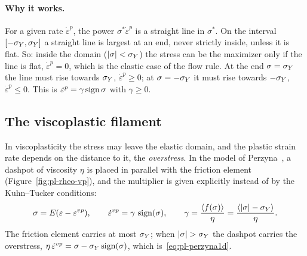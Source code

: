 \paragraph{Why it works.} For a given rate $\dot\varepsilon^p$, the power
$\sigma^\ast\dot\varepsilon^p$ is a straight line in $\sigma^\ast$. On the
interval $[-\sigma_{Y},\sigma_{Y}]$ a straight line is largest at an end, never strictly
inside, unless it is flat. So: inside the domain ($|\sigma|<\sigma_{Y}$) the stress
can be the maximizer only if the line is flat, $\dot\varepsilon^p=0$, which is
the elastic case of the flow rule. At the end $\sigma=\sigma_{Y}$ the line must rise
towards $\sigma_{Y}$, $\dot\varepsilon^p\ge0$; at $\sigma=-\sigma_{Y}$ it must rise towards
$-\sigma_{Y}$, $\dot\varepsilon^p\le0$. This is
$\dot\varepsilon^p=\gamma\operatorname{sign}\sigma$ with $\gamma\ge0$.

\subsection{The viscoplastic filament}\label{ssec:pl-vp1d}
%
In viscoplasticity the stress may leave the elastic domain, and the plastic
strain rate depends on the distance to it, the \emph{overstress}. In the model
of Perzyna~\cite{Perzyna1966}, a dashpot of viscosity $\eta$ is placed in
parallel with the friction element (Figure~\ref{fig:pl-rheo-vp}), and the
multiplier is given explicitly instead of by the Kuhn--Tucker conditions:
\begin{equation}\label{eq:pl-perzyna1d}
  \sigma=E(\varepsilon-\varepsilon^{vp}),\qquad
  \dot\varepsilon^{vp}=\gamma\,\operatorname{sign}(\sigma),\qquad
  \gamma=\frac{\langle f(\sigma)\rangle}{\eta}=\frac{\langle |\sigma|-\sigma_{Y}\rangle}{\eta}.
\end{equation}
The friction element carries at most $\sigma_{Y}$; when $|\sigma|>\sY$ the dashpot
carries the overstress, $\eta\,\dot\varepsilon^{vp}=\sigma-\sigma_{Y}\operatorname{sign}(\sigma)$,
which is~\eqref{eq:pl-perzyna1d}.


